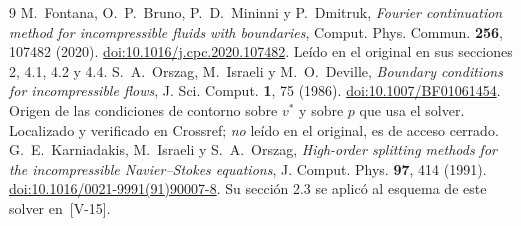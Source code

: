 \documentclass[11pt,a4paper]{article}
\begin{document}
\begin{thebibliography}{9}
 M.~Fontana, O.~P.~Bruno, P.~D.~Mininni y P.~Dmitruk,
\emph{Fourier continuation method for incompressible fluids with boundaries},
Comput. Phys. Commun. \textbf{256}, 107482 (2020).
\href{https://doi.org/10.1016/j.cpc.2020.107482}{doi:10.1016/j.cpc.2020.107482}.
Leído en el original en sus secciones 2, 4.1, 4.2 y 4.4.
 S.~A.~Orszag, M.~Israeli y M.~O.~Deville,
\emph{Boundary conditions for incompressible flows},
J. Sci. Comput. \textbf{1}, 75 (1986).
\href{https://doi.org/10.1007/BF01061454}{doi:10.1007/BF01061454}.
Origen de las condiciones de contorno sobre $v^*$ y sobre $p$ que usa el solver.
Localizado y verificado en Crossref; \emph{no} leído en el original, es de acceso cerrado.
 G.~E.~Karniadakis, M.~Israeli y S.~A.~Orszag,
\emph{High-order splitting methods for the incompressible Navier--Stokes equations},
J. Comput. Phys. \textbf{97}, 414 (1991).
\href{https://doi.org/10.1016/0021-9991(91)90007-8}{doi:10.1016/0021-9991(91)90007-8}.
Su sección 2.3 se aplicó al esquema de este solver en~[V-15].
\end{thebibliography}
\end{document}

